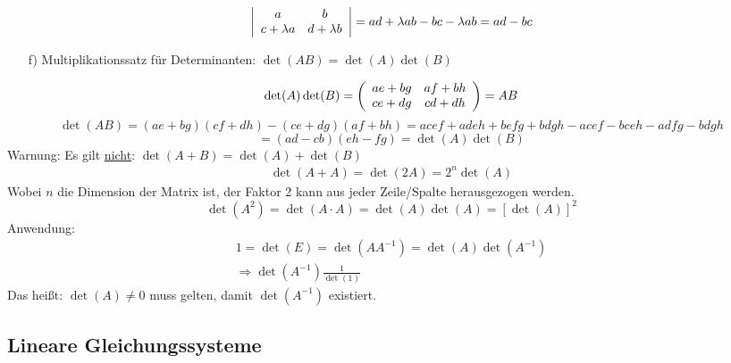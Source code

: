 \documentclass{article}
\begin{document}
\begin{equation*}
    \left\lvert \begin{array}{c c}a & b\\c+\lambda a & d+\lambda b\end{array} \right\rvert = ad+\lambda ab - bc -\lambda ab = ad - bc
\end{equation*}
\begin{itemize}
    \item[f)] Multiplikationssatz für Determinanten: $\det(AB) = \det(A)\det(B)$
\end{itemize}
\begin{equation*}
    \det(A)\det(B) = \left(\begin{array}{c c}ae + bg& af + bh\\ce + dg & cd + dh\end{array}\right) = AB
\end{equation*}
\begin{equation*}
    \det(AB)=(ae+bg)(cf+dh)-(ce+dg)(af+bh)=acef+adeh+befg+bdgh-acef-bceh-adfg-bdgh
\end{equation*}
\begin{equation*}
    = (ad-cb)(eh-fg) = \det(A)\det(B)
\end{equation*}
Warnung: Es gilt \underline{nicht}: $\det(A+B) = \det(A)+\det(B)$\\
\begin{eqnarray*}
    \det(A+A) = \det(2A) = 2^n\det(A)
\end{eqnarray*}
Wobei $n$ die Dimension der Matrix ist, der Faktor 2 kann aus jeder Zeile/Spalte herausgezogen werden.\\
\begin{equation*}
    \det(A^2)=\det(A\cdot A)=\det(A) \det(A) = \left[\det(A)\right]^2
\end{equation*}
Anwendung:
\begin{eqnarray*}
    1 = \det(E) = \det(AA^{-1}) = \det(A)\det(A^{-1})\\
    \Rightarrow \det(A^{-1})\frac{1}{\det(1)}
\end{eqnarray*}
Das heißt: $\det(A) \neq 0$ muss gelten, damit $\det(A^{-1})$ existiert.

\subsection{Lineare Gleichungssysteme}
\end{document}
